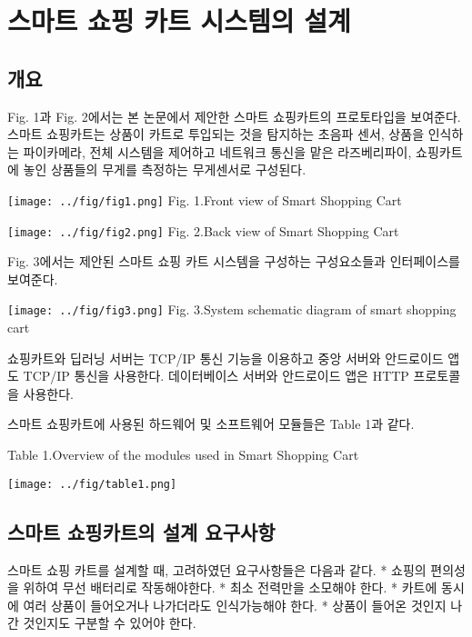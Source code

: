 \documentclass[smallextended]{svjour3}       %
\begin{document}
\hypertarget{uxc2a4uxb9c8uxd2b8-uxc1fcuxd551-uxce74uxd2b8-uxc2dcuxc2a4uxd15cuxc758-uxc124uxacc4}{%
\section{스마트 쇼핑 카트 시스템의
설계}\label{uxc2a4uxb9c8uxd2b8-uxc1fcuxd551-uxce74uxd2b8-uxc2dcuxc2a4uxd15cuxc758-uxc124uxacc4}}

\hypertarget{uxac1cuxc694}{%
\subsection{개요}\label{uxac1cuxc694}}

Fig. 1과 Fig. 2에서는 본 논문에서 제안한 스마트 쇼핑카트의 프로토타입을
보여준다. 스마트 쇼핑카트는 상품이 카트로 투입되는 것을 탐지하는 초음파
센서, 상품을 인식하는 파이카메라, 전체 시스템을 제어하고 네트워크 통신을
맡은 라즈베리파이, 쇼핑카트에 놓인 상품들의 무게를 측정하는 무게센서로
구성된다.

\texttt{[image: ../fig/fig1.png]} Fig. 1.Front view of Smart Shopping
Cart

\texttt{[image: ../fig/fig2.png]} Fig. 2.Back view of Smart Shopping
Cart

Fig. 3에서는 제안된 스마트 쇼핑 카트 시스템을 구성하는 구성요소들과
인터페이스를 보여준다.

\texttt{[image: ../fig/fig3.png]} Fig. 3.System schematic diagram of
smart shopping cart

쇼핑카트와 딥러닝 서버는 TCP/IP 통신 기능을 이용하고 중앙 서버와
안드로이드 앱도 TCP/IP 통신을 사용한다. 데이터베이스 서버와 안드로이드
앱은 HTTP 프로토콜을 사용한다.

스마트 쇼핑카트에 사용된 하드웨어 및 소프트웨어 모듈들은 Table 1과 같다.

Table 1.Overview of the modules used in Smart Shopping Cart

\texttt{[image: ../fig/table1.png]}

\hypertarget{uxc2a4uxb9c8uxd2b8-uxc1fcuxd551uxce74uxd2b8uxc758-uxc124uxacc4-uxc694uxad6cuxc0acuxd56d}{%
\subsection{스마트 쇼핑카트의 설계
요구사항}\label{uxc2a4uxb9c8uxd2b8-uxc1fcuxd551uxce74uxd2b8uxc758-uxc124uxacc4-uxc694uxad6cuxc0acuxd56d}}

스마트 쇼핑 카트를 설계할 때, 고려하였던 요구사항들은 다음과 같다. *
쇼핑의 편의성을 위하여 무선 배터리로 작동해야한다. * 최소 전력만을
소모해야 한다. * 카트에 동시에 여러 상품이 들어오거나 나가더라도
인식가능해야 한다. * 상품이 들어온 것인지 나간 것인지도 구분할 수 있어야
한다.
\end{document}
